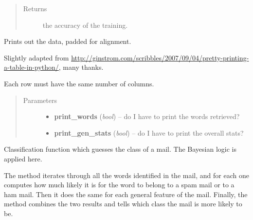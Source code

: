 \documentclass[letterpaper,10pt,english]{sphinxmanual}
\begin{document}
\begin{fulllineitems}
\begin{fulllineitems}
\begin{quote}
\begin{description}
\begin{itemize}
\end{itemize}

\item[{Returns}] \leavevmode
the accuracy of the training.

\end{description}\end{quote}

\end{fulllineitems}


\begin{fulllineitems}
\label{index:naive_bayes.Bayes.bayes_print}
Prints out the data, padded for alignment.

Slightly adapted from \href{http://ginstrom.com/scribbles/2007/09/04/pretty-printing-a-table-in-python/}{http://ginstrom.com/scribbles/2007/09/04/pretty-printing-a-table-in-python/}, many thanks.

Each row must have the same number of columns.
\begin{quote}\begin{description}
\item[{Parameters}] \leavevmode\begin{itemize}
\item {} 
\textbf{print\_words} (\emph{bool}) -- do I have to print the words retrieved?

\item {} 
\textbf{print\_gen\_stats} (\emph{bool}) -- do I have to print the overall stats?

\end{itemize}

\end{description}\end{quote}

\end{fulllineitems}


\begin{fulllineitems}
\label{index:naive_bayes.Bayes.classify}
Classification function which guesses the class of a mail. The Bayesian logic        is applied here.

The method iterates through all the words identified in the mail,
and for each one computes how much likely it is for the word to belong
to a spam mail or to a ham mail. Then it does the same for each general
feature of the mail. Finally, the method combines the two results
and tells which class the mail is more likely to be.


\end{fulllineitems}
\end{fulllineitems}
\end{document}
